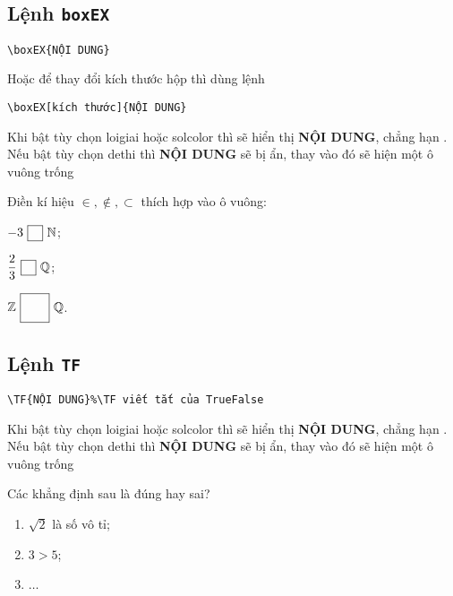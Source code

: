 \documentclass[12pt,a4paper,oneside]{article}
\begin{document}
\subsection{Lệnh \texttt{boxEX}}
\begin{verbatim}
\boxEX{NỘI DUNG}
\end{verbatim}
Hoặc để thay đổi kích thước hộp thì dùng lệnh
\begin{verbatim}
\boxEX[kích thước]{NỘI DUNG}
\end{verbatim}
Khi bật tùy chọn loigiai hoặc solcolor thì sẽ hiển thị  \textbf{NỘI DUNG}, chẳng hạn \boxEX{$\in$}. \\
Nếu bật tùy chọn dethi thì \textbf{NỘI DUNG} sẽ bị ẩn, thay vào đó sẽ hiện một ô vuông trống \boxEX{}
\begin{ex}
	Điền kí hiệu $\in, \not\in, \subset$ thích hợp vào ô vuông:
	\begin{listEX}[3]
		\item $-3\boxEX{$\not\in$}\mathbb{N}$;
		\item $\dfrac{2}{3}\boxEX{$\in$}\mathbb{Q}$;
		\item $\mathbb{Z}\boxEX[0.7cm]{$\subset$}\mathbb{Q}$.
	\end{listEX}
\end{ex}
\subsection{Lệnh \texttt{TF}}
\begin{verbatim}
\TF{NỘI DUNG}%\TF viết tắt của TrueFalse
\end{verbatim}
Khi bật tùy chọn loigiai hoặc solcolor thì sẽ hiển thị  \textbf{NỘI DUNG}, chẳng hạn . \\
Nếu bật tùy chọn dethi thì \textbf{NỘI DUNG} sẽ bị ẩn, thay vào đó sẽ hiện một ô vuông trống \boxEX{}
\begin{ex}
	Các khẳng định sau là đúng hay sai?
	\begin{enumerate}
		\item {} $\sqrt{2}$ là số vô tỉ;
		\item {} $3>5$;
		\item $\ldots$
	\end{enumerate}
\end{ex}
\end{document}
